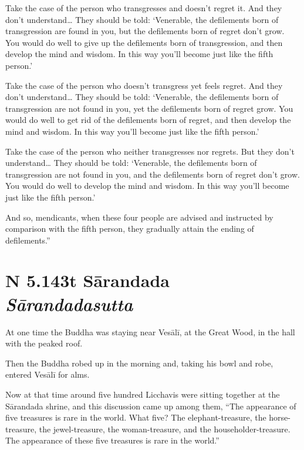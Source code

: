 \documentclass[12pt,openany]{book}%
\newcommand*{\suttatitleacronym}[1]{\smaller[2]{#1}\vspace*{.3em}}
\newcommand*{\suttatitletranslation}[1]{\linebreak{#1}}
\newcommand*{\suttatitleroot}[1]{\linebreak\smaller[2]\itshape{#1}}
\newcommand*{\tocacronym}[1]{\hspace*{-3.3em}{#1}\quad}
\newcommand*{\toctranslation}[1]{#1}
\newcommand*{\tocroot}[1]{(\textit{#1})}
\begin{document}
Take the case of the person who transgresses and doesn’t regret it. And they don’t understand… They should be told: ‘Venerable, the defilements born of transgression are found in you, but the defilements born of regret don’t grow. You would do well to give up the defilements born of transgression, and then develop the mind and wisdom. In this way you’ll become just like the fifth person.’ 

Take the case of the person who doesn’t transgress yet feels regret. And they don’t understand… They should be told: ‘Venerable, the defilements born of transgression are not found in you, yet the defilements born of regret grow. You would do well to get rid of the defilements born of regret, and then develop the mind and wisdom. In this way you’ll become just like the fifth person.’ 

Take the case of the person who neither transgresses nor regrets. But they don’t understand… They should be told: ‘Venerable, the defilements born of transgression are not found in you, and the defilements born of regret don’t grow. You would do well to develop the mind and wisdom. In this way you’ll become just like the fifth person.’ 

And so, mendicants, when these four people are advised and instructed by comparison with the fifth person, they gradually attain the ending of defilements.” 

%
\section*{{\suttatitleacronym AN 5.143}{\suttatitletranslation At Sārandada }{\suttatitleroot Sārandadasutta}}
\addcontentsline{toc}{section}{\tocacronym{AN 5.143} \toctranslation{At Sārandada } \tocroot{Sārandadasutta}}

At one time the Buddha was staying near \textsanskrit{Vesālī}, at the Great Wood, in the hall with the peaked roof. 

Then the Buddha robed up in the morning and, taking his bowl and robe, entered \textsanskrit{Vesālī} for alms. 

Now at that time around five hundred Licchavis were sitting together at the \textsanskrit{Sārandada} shrine, and this discussion came up among them, “The appearance of five treasures is rare in the world. What five? The elephant-treasure, the horse-treasure, the jewel-treasure, the woman-treasure, and the householder-treasure. The appearance of these five treasures is rare in the world.” 
\end{document}
